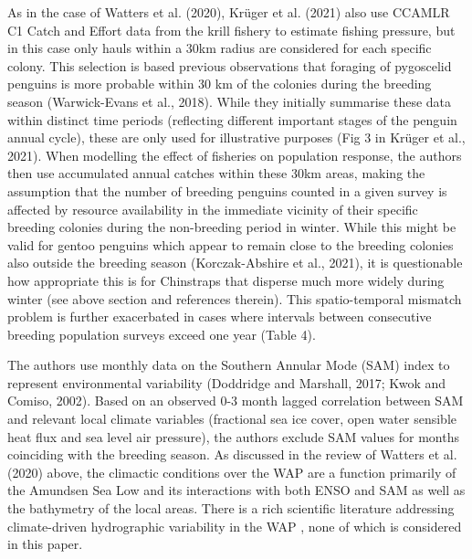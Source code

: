 \documentclass[]{elsarticle} %
\begin{document}
As in the case of Watters et al. (2020), Krüger et al. (2021) also use
CCAMLR C1 Catch and Effort data from the krill fishery to estimate
fishing pressure, but in this case only hauls within a 30km radius are
considered for each specific colony. This selection is based previous
observations that foraging of pygoscelid penguins is more probable
within 30 km of the colonies during the breeding season (Warwick-Evans
et al., 2018). While they initially summarise these data within distinct
time periods (reflecting different important stages of the penguin
annual cycle), these are only used for illustrative purposes (Fig 3 in
Krüger et al., 2021). When modelling the effect of fisheries on
population response, the authors then use accumulated annual catches
within these 30km areas, making the assumption that the number of
breeding penguins counted in a given survey is affected by resource
availability in the immediate vicinity of their specific breeding
colonies during the non-breeding period in winter. While this might be
valid for gentoo penguins which appear to remain close to the breeding
colonies also outside the breeding season (Korczak-Abshire et al.,
2021), it is questionable how appropriate this is for Chinstraps that
disperse much more widely during winter (see above section and
references therein). This spatio-temporal mismatch problem is further
exacerbated in cases where intervals between consecutive breeding
population surveys exceed one year (Table 4).

The authors use monthly data on the Southern Annular Mode (SAM) index to
represent environmental variability (Doddridge and Marshall, 2017; Kwok
and Comiso, 2002). Based on an observed 0-3 month lagged correlation
between SAM and relevant local climate variables (fractional sea ice
cover, open water sensible heat flux and sea level air pressure), the
authors exclude SAM values for months coinciding with the breeding
season. As discussed in the review of Watters et al. (2020) above, the
climactic conditions over the WAP are a function primarily of the
Amundsen Sea Low and its interactions with both ENSO and SAM as well as
the bathymetry of the local areas. There is a rich scientific literature
addressing climate-driven hydrographic variability in the WAP , none of
which is considered in this paper.
\end{document}
